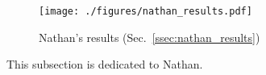 \begin{figure}
\texttt{[image: ./figures/nathan\_results.pdf]}
  \caption{Nathan's results (Sec.~\ref{ssec:nathan_results})}
  \label{plot_nathan_results}
\end{figure}

This subsection is dedicated to Nathan.
